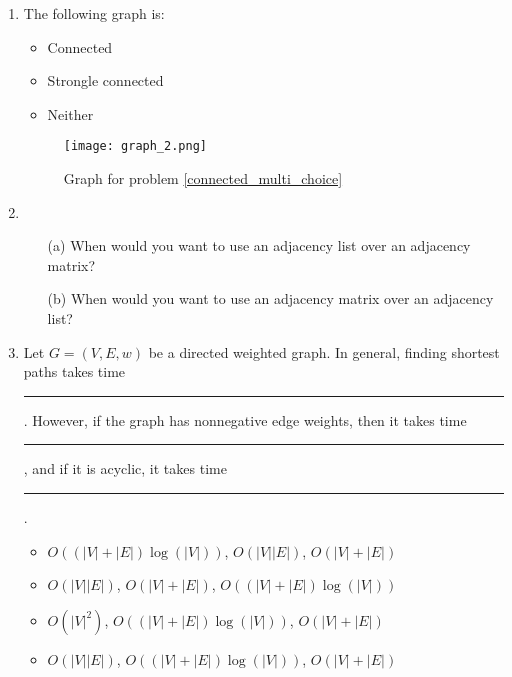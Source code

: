 \documentclass[12pt]{article}
\begin{document}
\newpage
\begin{enumerate}
    \item The following graph is:
    \begin{itemize}
        \item Connected
        \item Strongle connected
        \item Neither
    \end{itemize}
    \label{connected_multi_choice}
    \begin{center}
    \begin{figure}[h]
        \caption{Graph for problem \ref{connected_multi_choice}}
        \texttt{[image: graph\_2.png]}
    \end{figure}
    \end{center}
    \item 
        \begin{itemize}
            \item[(a)] When would you want to use an adjacency list over an adjacency matrix? \vspace{4cm}
            \item[(b)] When would you want to use an adjacency matrix over an adjacency list? \vspace{4cm}
        \end{itemize}
    \item Let $G = (V,E,w)$ be a directed weighted graph. In general, finding shortest paths takes time \rule{1cm}{0.15mm}. However, if the graph has nonnegative edge weights, then it takes time \rule{1cm}{0.15mm}, and if it is acyclic, it takes time \rule{1cm}{0.15mm}. 
    \begin{itemize}
        \item $O((|V|+|E|)\log(|V|))$, $O(|V||E|)$, $O(|V|+|E|)$
        \item $O(|V||E|)$, $O(|V|+|E|)$, $O((|V|+|E|)\log(|V|))$
        \item $O(|V|^2)$, $O((|V|+|E|)\log(|V|))$, $O(|V|+|E|)$
        \item $O(|V||E|)$, $O((|V|+|E|)\log(|V|))$, $O(|V|+|E|)$
    \end{itemize} 


\end{enumerate}
\end{document}
